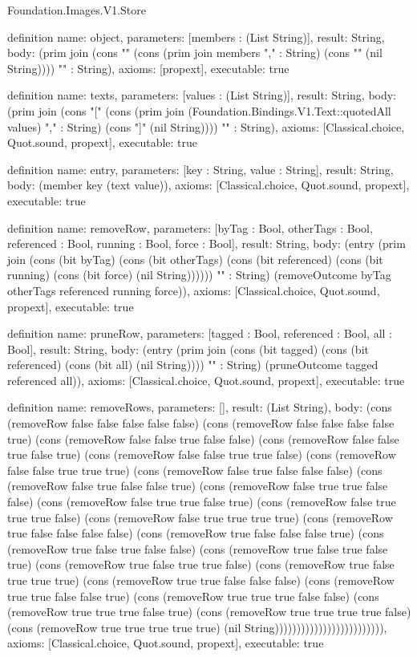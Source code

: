 \begin{lexlean}{Foundation.Images.V1.Store}
\begin{semanticmodule}
definition{
  name: object,
  parameters: [members : (List String)],
  result: String,
  body: (prim join (cons "{" (cons (prim join members "," : String) (cons "}" (nil String)))) "" : String),
  axioms: [propext],
  executable: true
}

definition{
  name: texts,
  parameters: [values : (List String)],
  result: String,
  body: (prim join (cons "[" (cons (prim join (Foundation.Bindings.V1.Text::quotedAll values) "," : String) (cons "]" (nil String)))) "" : String),
  axioms: [Classical.choice, Quot.sound, propext],
  executable: true
}

definition{
  name: entry,
  parameters: [key : String, value : String],
  result: String,
  body: (member key (text value)),
  axioms: [Classical.choice, Quot.sound, propext],
  executable: true
}

definition{
  name: removeRow,
  parameters: [byTag : Bool, otherTags : Bool, referenced : Bool, running : Bool, force : Bool],
  result: String,
  body: (entry (prim join (cons (bit byTag) (cons (bit otherTags) (cons (bit referenced) (cons (bit running) (cons (bit force) (nil String)))))) "" : String) (removeOutcome byTag otherTags referenced running force)),
  axioms: [Classical.choice, Quot.sound, propext],
  executable: true
}

definition{
  name: pruneRow,
  parameters: [tagged : Bool, referenced : Bool, all : Bool],
  result: String,
  body: (entry (prim join (cons (bit tagged) (cons (bit referenced) (cons (bit all) (nil String)))) "" : String) (pruneOutcome tagged referenced all)),
  axioms: [Classical.choice, Quot.sound, propext],
  executable: true
}

definition{
  name: removeRows,
  parameters: [],
  result: (List String),
  body: (cons (removeRow false false false false false) (cons (removeRow false false false false true) (cons (removeRow false false true false false) (cons (removeRow false false true false true) (cons (removeRow false false true true false) (cons (removeRow false false true true true) (cons (removeRow false true false false false) (cons (removeRow false true false false true) (cons (removeRow false true true false false) (cons (removeRow false true true false true) (cons (removeRow false true true true false) (cons (removeRow false true true true true) (cons (removeRow true false false false false) (cons (removeRow true false false false true) (cons (removeRow true false true false false) (cons (removeRow true false true false true) (cons (removeRow true false true true false) (cons (removeRow true false true true true) (cons (removeRow true true false false false) (cons (removeRow true true false false true) (cons (removeRow true true true false false) (cons (removeRow true true true false true) (cons (removeRow true true true true false) (cons (removeRow true true true true true) (nil String))))))))))))))))))))))))),
  axioms: [Classical.choice, Quot.sound, propext],
  executable: true
}


\end{semanticmodule}
\end{lexlean}
